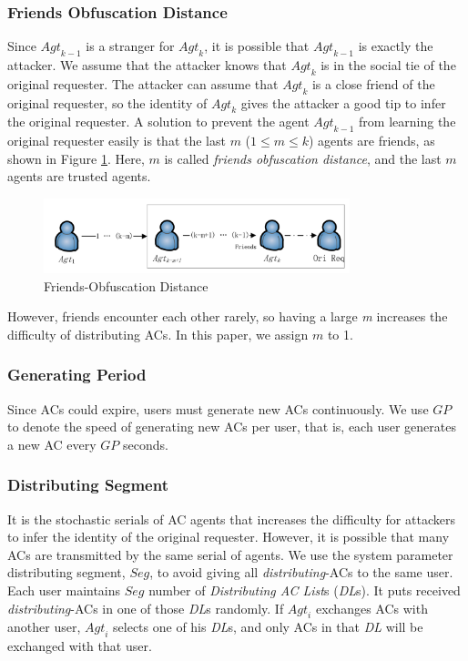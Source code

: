 \documentclass[conference]{IEEEtran}
\begin{document}
\subsubsection{ Friends Obfuscation Distance}

Since ${Agt}_{k-1}$ is a stranger for ${Agt}_k$, it is possible that ${Agt}_{k-1}$ is exactly the attacker. We assume that the attacker knows that ${Agt}_k$ is in the social tie of the original requester. The attacker can assume that ${Agt}_k$ is a close friend of the original requester, so the identity of ${Agt}_k$ gives the attacker a good tip to infer the original requester. A solution to prevent the agent ${Agt}_{k-1}$ from learning the original requester easily is that the last $m$ ($1\leq m\leq k$) agents are friends, as shown in Figure \ref{fig:FriObfuscationDistance}. Here, $m$ is called \textit{friends obfuscation distance}, and the last $m$ agents are trusted agents.

\begin{figure} [hbtp]
  \centering 
  \includegraphics[width=3.5in]{figures/ACPFriObfDis.png}
  \caption{Friends-Obfuscation Distance} 
  \label{fig:FriObfuscationDistance} %
\end{figure}

However, friends encounter each other rarely, so having a large \textit{m} increases the difficulty of distributing ACs. In this paper, we assign $m$ to 1.

\subsubsection{ Generating Period}

Since ACs could expire, users must generate new ACs continuously. We use $GP$ to denote the speed of generating new ACs per user, that is, each user generates a new AC every $GP$ seconds.

\subsubsection{ Distributing Segment} \label{subsubsecDisSeg}

It is the stochastic serials of AC agents that increases the difficulty for attackers to infer the identity of the original requester. However, it is possible that many ACs are transmitted by the same serial of agents. We use the system parameter distributing segment, $Seg$, to avoid giving all \textit{distributing}-ACs to the same user. Each user maintains $Seg$ number of \textit{Distributing AC List}s (\textit{DL}s). It puts received \textit{distributing}-ACs in one of those \textit{DL}s randomly. If ${Agt}_i$ exchanges ACs with another user, ${Agt}_i$ selects one of his \textit{DL}s, and only ACs in that \textit{DL} will be exchanged with that user.
\end{document}
